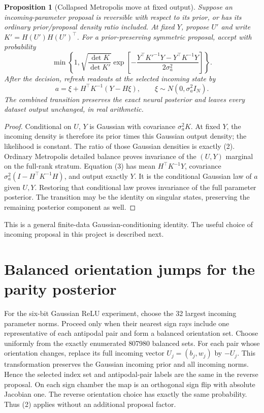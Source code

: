 \documentclass[11pt]{article}
\newtheorem{proposition}{Proposition}
\begin{document}
\begin{proposition}[Collapsed Metropolis move at fixed output]
Suppose an incoming-parameter proposal is reversible with respect to its
prior, or has its ordinary prior/proposal density ratio included.
At fixed $Y$, propose $U'$ and write $K'=H(U')H(U')^\top$.
For a prior-preserving symmetric proposal, accept with probability
\[
 \min\left\{1,\sqrt{\frac{\det K}{\det K'}}
 \exp\left[-\frac{Y^\top K'^{-1}Y-Y^\top K^{-1}Y}
                         {2\sigma_a^2}\right]\right\}.\tag{2}
\]
After the decision, refresh readouts at the selected incoming state by
\[
 a=\xi+H^\top K^{-1}(Y-H\xi),\qquad
 \xi\sim N(0,\sigma_a^2I_N).\tag{3}
\]
The combined transition preserves the exact neural posterior and leaves
every dataset output unchanged, in real arithmetic.
\end{proposition}
\begin{proof}
Conditional on $U$, $Y$ is Gaussian with covariance $\sigma_a^2K$.
At fixed $Y$, the incoming density is therefore its prior times this
Gaussian output density; the likelihood is constant. The ratio of those
Gaussian densities is exactly (2). Ordinary Metropolis detailed balance
proves invariance of the $(U,Y)$ marginal on the full-rank stratum.
Equation (3) has mean $H^\top K^{-1}Y$, covariance
$\sigma_a^2(I-H^\top K^{-1}H)$, and output exactly $Y$.
It is the conditional Gaussian law of $a$ given $U,Y$. Restoring that
conditional law proves invariance of the full parameter posterior.
The transition may be the identity on singular states, preserving the
remaining posterior component as well.
\end{proof}
This is a general finite-data Gaussian-conditioning identity. The useful
choice of incoming proposal in this project is described next.

\section{Balanced orientation jumps for the parity posterior}
For the six-bit Gaussian ReLU experiment, choose the 32 largest incoming
parameter norms. Proceed only when their nearest sign rays include one
representative of each antipodal pair and form a balanced orientation
set. Choose uniformly from the exactly enumerated 807980 balanced sets.
For each pair whose orientation changes, replace its full incoming vector
$U_j=(b_j,w_j)$ by $-U_j$. This transformation preserves the Gaussian
incoming prior and all incoming norms. Hence the selected index set and
antipodal-pair labels are the same in the reverse proposal. On each
sign chamber the map is an orthogonal sign flip with absolute Jacobian
one. The reverse orientation choice has exactly the same probability.
Thus (2) applies without an additional proposal factor.
\end{document}
